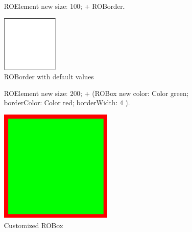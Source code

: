 \documentclass[a4paper,10pt,twoside]{book}
\begin{document}
\begin{figure}[H]
      \begin{minipage}[t]{0.5\textwidth}
      \vspace{0pt}
     \begin{code}
     
	ROElement new 
		size: 100; 
		+ ROBorder.	\end{code}
   \end{minipage}
   \hfill
   \begin{minipage}[t]{0.4\textwidth}
      \vspace{0pt} \raggedright
       \centering
		\includegraphics[width=0.25\textwidth]{border}
   \end{minipage}
\caption{ROBorder with default values}
\label{fig:border}
\end{figure}  

\begin{figure}[H]
      \begin{minipage}[t]{0.5\textwidth}
      \vspace{0pt}
     \begin{code}
     
ROElement new 
	size: 200; 
	+ (ROBox new 
				color: Color green; 
				borderColor: Color red; 
				borderWidth: 4 ).	\end{code}
   \end{minipage}
   \hfill
   \begin{minipage}[t]{0.4\textwidth}
      \vspace{0pt} \raggedright
       \centering
		\includegraphics[width=0.5\textwidth]{box}
   \end{minipage}
\caption{Customized ROBox}
\label{fig:box}
\end{figure} 
\end{document}
